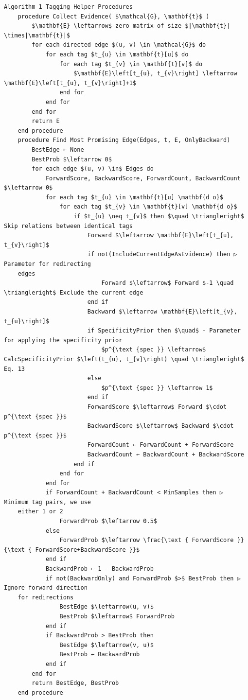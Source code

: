 \documentclass[10pt]{article}
\begin{document}
\begin{verbatim}
Algorithm 1 Tagging Helper Procedures
    procedure Collect Evidence( $\mathcal{G}, \mathbf{t}$ )
        $\mathbf{E} \leftarrow$ zero matrix of size $|\mathbf{t}| \times|\mathbf{t}|$
        for each directed edge $(u, v) \in \mathcal{G}$ do
            for each tag $t_{u} \in \mathbf{t}[u]$ do
                for each tag $t_{v} \in \mathbf{t}[v]$ do
                    $\mathbf{E}\left[t_{u}, t_{v}\right] \leftarrow \mathbf{E}\left[t_{u}, t_{v}\right]+1$
                end for
            end for
        end for
        return E
    end procedure
    procedure Find Most Promising Edge(Edges, t, E, OnlyBackward)
        BestEdge ← None
        BestProb $\leftarrow 0$
        for each edge $(u, v) \in$ Edges do
            ForwardScore, BackwardScore, ForwardCount, BackwardCount $\leftarrow 0$
            for each tag $t_{u} \in \mathbf{t}[u] \mathbf{d o}$
                for each tag $t_{v} \in \mathbf{t}[v] \mathbf{d o}$
                    if $t_{u} \neq t_{v}$ then $\quad \triangleright$ Skip relations between identical tags
                        Forward $\leftarrow \mathbf{E}\left[t_{u}, t_{v}\right]$
                        if not(IncludeCurrentEdgeAsEvidence) then ▷ Parameter for redirecting
    edges
                            Forward $\leftarrow$ Forward $-1 \quad \triangleright$ Exclude the current edge
                        end if
                        Backward $\leftarrow \mathbf{E}\left[t_{v}, t_{u}\right]$
                        if SpecificityPrior then $\quad$ - Parameter for applying the specificity prior
                            $p^{\text {spec }} \leftarrow$ CalcSpecificityPrior $\left(t_{u}, t_{v}\right) \quad \triangleright$ Eq. 13
                        else
                            $p^{\text {spec }} \leftarrow 1$
                        end if
                        ForwardScore $\leftarrow$ Forward $\cdot p^{\text {spec }}$
                        BackwardScore $\leftarrow$ Backward $\cdot p^{\text {spec }}$
                        ForwardCount ← ForwardCount + ForwardScore
                        BackwardCount ← BackwardCount + BackwardScore
                    end if
                end for
            end for
            if ForwardCount + BackwardCount < MinSamples then ▷ Minimum tag pairs, we use
    either 1 or 2
                ForwardProb $\leftarrow 0.5$
            else
                ForwardProb $\leftarrow \frac{\text { ForwardScore }}{\text { ForwardScore+BackwardScore }}$
            end if
            BackwardProb ⟵ 1 - BackwardProb
            if not(BackwardOnly) and ForwardProb $>$ BestProb then ▷ Ignore forward direction
    for redirections
                BestEdge $\leftarrow(u, v)$
                BestProb $\leftarrow$ ForwardProb
            end if
            if BackwardProb > BestProb then
                BestEdge $\leftarrow(v, u)$
                BestProb ← BackwardProb
            end if
        end for
        return BestEdge, BestProb
    end procedure
\end{verbatim}
\end{document}

